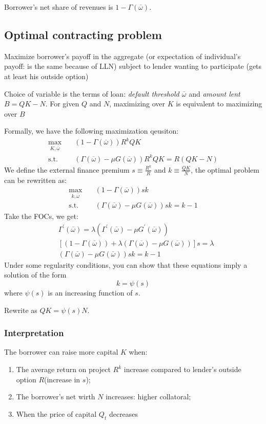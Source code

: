 Borrower's net share of revenues is $1-\Gamma(\overline{\omega})$.

\subsection{Optimal contracting problem}
Maximize borrower’s payoff in the aggregate (or expectation
of individual’s payoff: is the same because of LLN) subject to
lender wanting to participate (gets at least his outside option)

Choice of variable is the terms of loan: \textit{default threshold $\overline{\omega}$} and \textit{amount lent $B = QK-N$}.
For given $Q$ and $N$, maximizing over $K$ is equivalent to maximizing over $B$

Formally, we have the following maximization qeusiton:
\begin{align*}
    \max_{K, \overline{\omega}} & \quad \left(1-\Gamma(\overline{\omega})\right) R^k QK \\
    \text{s.t.} & \quad \left(\Gamma(\overline{\omega}) - \mu G(\overline{\omega} )\right)R^k QK = R(QK-N)
\end{align*}
We define the external finance premium $s \equiv \frac{R^k}{R}$ and $k \equiv \frac{QK}{N}$,
the optimal problem can be rewritten as:
\begin{align*}
    \max_{k, \overline{\omega}} & \quad \left(1-\Gamma(\overline{\omega})\right) s k \\
    \text{s.t.} & \quad \left(\Gamma(\overline{\omega}) - \mu G(\overline{\omega} )\right) s k = k - 1
\end{align*}
Take the FOCs, we get:
\begin{align*}
    & \Gamma^{\prime} (\overline{\omega} ) = \lambda (\Gamma^{\prime} (\overline{\omega} ) - \mu G^{\prime} (\overline{\omega} )) \\
    & \left[(1 - \Gamma(\overline{\omega})) + \lambda \left(\Gamma(\overline{\omega} ) - \mu G(\overline{\omega} ) \right)\right] s = \lambda \\
    & \left(\Gamma(\overline{\omega}) - \mu G(\overline{\omega} )\right) s k = k - 1
\end{align*}
Under some regularity conditions, you can show that these
equations imply a solution of the form 
\[k = \psi (s)\]
where $\psi (s)$ is an increasing function of $s$.

Rewrite as $QK = \psi(s) N.$

\subsubsection{Interpretation}
The borrower can raise more capital $K$ when:
\begin{enumerate}
    \item The average return on project $R^k$ increase compared to lender's outside option $R$(increase in $s$);
    \item The borrower's net wirth $N$ increases: higher collatoral;
    \item When the price of capital $Q_t$ decreases
\end{enumerate}


